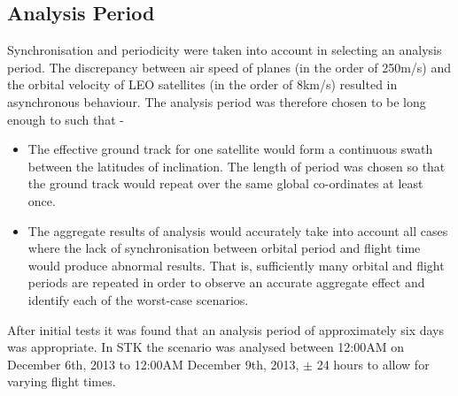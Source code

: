 \subsection{Analysis Period} \label{sec:analysis_period}
Synchronisation and periodicity were taken into account in selecting an analysis period. The discrepancy between air speed of planes (in the order of 250m/s) and the orbital velocity of LEO satellites (in the order of 8km/s) resulted in asynchronous behaviour.  The analysis period was therefore chosen to be long enough to such that - 
\begin{itemize}
	\item The effective ground track for one satellite would form a continuous swath between the latitudes of inclination. The length of period was chosen so that the ground track would repeat over the same global co-ordinates at least once. 
	\item The aggregate results of analysis would accurately take into account all cases where the lack of synchronisation between orbital period and flight time would produce abnormal results. That is, sufficiently many orbital and flight periods are repeated in order to observe an accurate aggregate effect and identify each of the worst-case scenarios.
\end{itemize} 
After initial tests it was found that an analysis period of approximately six days was appropriate. In STK the scenario was analysed between 12:00AM on December 6th, 2013 to 12:00AM December 9th, 2013, $\pm$ 24 hours to allow for varying flight times.

